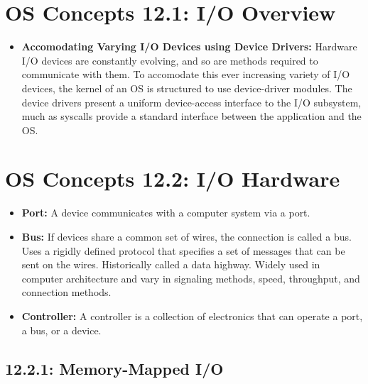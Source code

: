 \documentclass[12pt]{article}
\begin{document}
\section*{OS Concepts 12.1: I/O Overview}

\begin{itemize}
    \item \textbf{Accomodating Varying I/O Devices using Device Drivers:} Hardware I/O devices are constantly evolving, and so are methods required to communicate with them. To accomodate this ever increasing variety of I/O devices, the kernel of an OS is structured to use device-driver modules. The device drivers present a uniform device-access interface to the I/O subsystem, much as syscalls provide a standard interface between the application and the OS.
\end{itemize}

\section*{OS Concepts 12.2: I/O Hardware}

\begin{itemize}
    \item \textbf{Port:} A device communicates with a computer system via a port.
    \item \textbf{Bus:} If devices share a common set of wires, the connection is called a bus. Uses a rigidly defined protocol that specifies a set of messages that can be sent on the wires. Historically called a data highway. Widely used in computer architecture and vary in signaling methods, speed, throughput, and connection methods.
    \item \textbf{Controller:}  A controller is a collection of electronics that can operate a port, a bus, or a device.
\end{itemize}

\subsection*{12.2.1: Memory-Mapped I/O}
\end{document}
